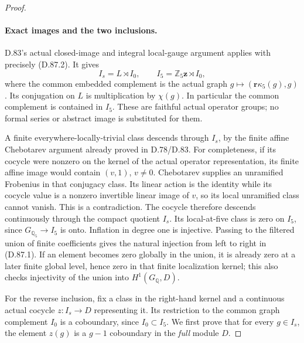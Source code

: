 \begin{proof}
\paragraph{Exact images and the two inclusions.}
D.83's actual closed-image and integral local-gauge argument
applies with precisely (D.87.2). It gives
\[
 I_s=L\rtimes I_0,\qquad
 I_5=\mathbb Z_5\mathbf z\rtimes I_0,                 \tag{D.87.5}
\]
where the common embedded complement is the actual graph
\(g\mapsto(\mathbf r\kappa_5(g),g)\). Its conjugation on
\(L\) is multiplication by \(\chi(g)\).
In particular the common complement is contained in \(I_5\).
These are faithful actual operator groups; no formal series
or abstract image is substituted for them.

A finite everywhere-locally-trivial class descends through
\(I_s\), by the finite affine Chebotarev argument already
proved in D.78/D.83. For completeness, if its cocycle were
nonzero on the kernel of the actual operator representation,
its finite affine image would contain \((v,1)\), \(v\ne0\).
Chebotarev supplies an unramified Frobenius in that conjugacy
class. Its linear action is the identity while its cocycle
value is a nonzero invertible linear image of \(v\), so its
local unramified class cannot vanish. This is a contradiction.
The cocycle therefore descends continuously through the compact
quotient \(I_s\). Its local-at-five class is zero on \(I_5\),
since \(G_{\mathbb Q_5}\to I_5\) is onto.
Inflation in degree one is injective. Passing to the filtered
union of finite coefficients gives the natural injection from
left to right in (D.87.1). If an element becomes zero globally
in the union, it is already zero at a later finite global
level, hence zero in that finite localization kernel; this
also checks injectivity of the union into \(H^1(G_{\mathbb Q},D)\).

For the reverse inclusion, fix a class in the right-hand kernel
and a continuous actual cocycle \(z:I_s\to D\) representing
it. Its restriction to the common graph complement \(I_0\)
is a coboundary, since \(I_0\subset I_5\). We first prove
that for every \(g\in I_s\), the element \(z(g)\) is a
\(g-1\) coboundary in the \emph{full} module \(D\).


\end{proof}

